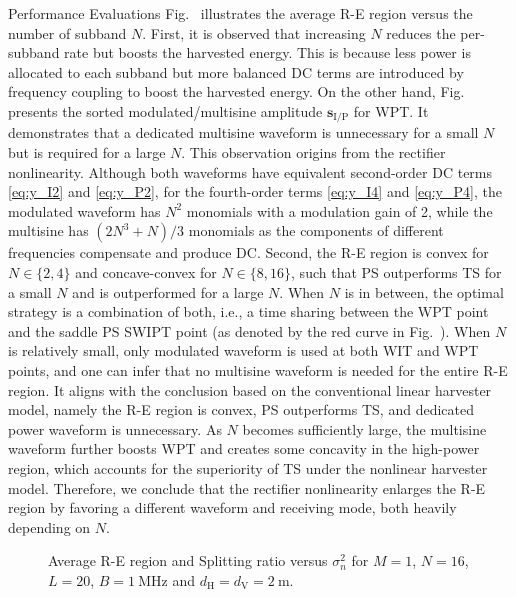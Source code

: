 \documentclass[journal,12pt,onecolumn,draftclsnofoot]{IEEEtran}
\begin{document}
\begin{section}{Performance Evaluations}
		Fig.~ illustrates the average R-E region versus the number of subband $N$. First, it is observed that increasing $N$ reduces the per-subband rate but boosts the harvested energy. This is because less power is allocated to each subband but more balanced DC terms are introduced by frequency coupling to boost the harvested energy. On the other hand, Fig.~ presents the sorted modulated/multisine amplitude $\boldsymbol{s}_{\mathrm{I/P}}$ for WPT. It demonstrates that a dedicated multisine waveform is unnecessary for a small $N$ but is required for a large $N$. This observation origins from the rectifier nonlinearity. Although both waveforms have equivalent second-order DC terms \eqref{eq:y_I2} and \eqref{eq:y_P2}, for the fourth-order terms \eqref{eq:y_I4} and \eqref{eq:y_P4}, the modulated waveform has $N^2$ monomials with a modulation gain of \num{2}, while the multisine has $(2N^3+N)/3$ monomials as the components of different frequencies compensate and produce DC. Second, the R-E region is convex for $N \in \{2,4\}$ and concave-convex for $N \in \{8,16\}$, such that PS outperforms TS for a small $N$ and is outperformed for a large $N$. When $N$ is in between, the optimal strategy is a combination of both, i.e., a time sharing between the WPT point and the saddle PS SWIPT point (as denoted by the red curve in Fig.~). When $N$ is relatively small, only modulated waveform is used at both WIT and WPT points, and one can infer that no multisine waveform is needed for the entire R-E region. It aligns with the conclusion based on the conventional linear harvester model, namely the R-E region is convex, PS outperforms TS, and dedicated power waveform is unnecessary. As $N$ becomes sufficiently large, the multisine waveform further boosts WPT and creates some concavity in the high-power region, which accounts for the superiority of TS under the nonlinear harvester model. Therefore, we conclude that the rectifier nonlinearity enlarges the R-E region by favoring a different waveform and receiving mode, both heavily depending on $N$.

		\begin{figure}[!t]
			\centering
			\caption{Average R-E region and Splitting ratio versus $\sigma_n^2$ for $M=1$, $N=16$, $L=20$, $B=\SI{1}{\MHz}$ and $d_{\mathrm{H}}=d_{\mathrm{V}}=\SI{2}{\meter}$.}
		\end{figure}


\end{section}
\end{document}
